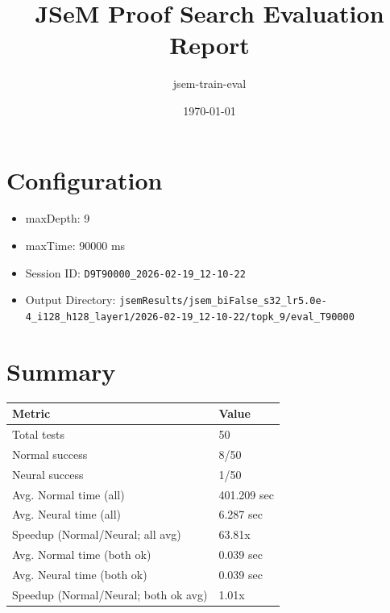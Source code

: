 \documentclass[a4paper,10pt]{article}
\title{JSeM Proof Search Evaluation Report}
\author{jsem-train-eval}
\date{\today}
\begin{document}
\maketitle

\section{Configuration}
\begin{itemize}
\item maxDepth: 9
\item maxTime: 90000 ms
\item Session ID: \texttt{D9T90000\_2026-02-19\_12-10-22}
\item Output Directory: \texttt{jsemResults/jsem\_biFalse\_s32\_lr5.0e-4\_i128\_h128\_layer1/2026-02-19\_12-10-22/topk\_9/eval\_T90000}
\end{itemize}

\section{Summary}
\begin{tabular}{ll}
\toprule
\textbf{Metric} & \textbf{Value} \\
\midrule
Total tests & 50 \\
Normal success & 8/50 \\
Neural success & 1/50 \\
\midrule
Avg. Normal time (all) & 401.209 sec \\
Avg. Neural time (all) & 6.287 sec \\
Speedup (Normal/Neural; all avg) & 63.81x \\
Avg. Normal time (both ok) & 0.039 sec \\
Avg. Neural time (both ok) & 0.039 sec \\
Speedup (Normal/Neural; both ok avg) & 1.01x \\
\bottomrule
\end{tabular}
\end{document}

